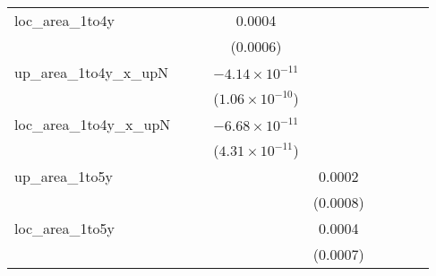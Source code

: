 \begin{tabular}{lcccccccc}
   loc\_area\_1to4y             &                          &                          & 0.0004                   &                          &                               &                          &                          &   \\   
                                &                          &                          & (0.0006)                 &                          &                               &                          &                          &   \\   
   up\_area\_1to4y\_x\_upN      &                          &                          & $-4.14\times 10^{-11}$   &                          &                               &                          &                          &   \\   
                                &                          &                          & ($1.06\times 10^{-10}$)  &                          &                               &                          &                          &   \\   
   loc\_area\_1to4y\_x\_upN     &                          &                          & $-6.68\times 10^{-11}$   &                          &                               &                          &                          &   \\   
                                &                          &                          & ($4.31\times 10^{-11}$)  &                          &                               &                          &                          &   \\   
   up\_area\_1to5y              &                          &                          &                          & 0.0002                   &                               &                          &                          &   \\   
                                &                          &                          &                          & (0.0008)                 &                               &                          &                          &   \\   
   loc\_area\_1to5y             &                          &                          &                          & 0.0004                   &                               &                          &                          &   \\   
                                &                          &                          &                          & (0.0007)                 &                               &                          &                          &   \\   

\end{tabular}
